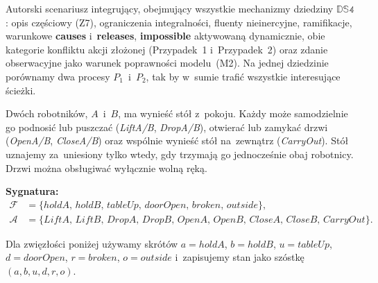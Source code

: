 \documentclass[11pt,a4paper]{article}
\newcommand{\causes}{\textbf{causes}}
\newcommand{\impossible}{\textbf{impossible}}
\newcommand{\releases}{\textbf{releases}}
\theoremstyle{definition}
\begin{document}
\noindent Autorski scenariusz integrujący, obejmujący wszystkie mechanizmy
dziedziny $\mathbb{DS4}$: opis częściowy (Z7), ograniczenia integralności,
fluenty nieinercyjne, ramifikacje, warunkowe \causes{} i~\releases{},
\impossible{} aktywowaną dynamicznie, obie kategorie konfliktu akcji
złożonej (Przypadek~1 i~Przypadek~2) oraz zdanie obserwacyjne jako
warunek poprawności modelu~(M2). Na jednej dziedzinie porównamy dwa procesy $P_1$~i~$P_2$,
tak by w~sumie trafić wszystkie interesujące ścieżki.

Dwóch robotników, $A$~i~$B$, ma wynieść stół z~pokoju. Każdy może
samodzielnie go podnosić lub puszczać (\textit{LiftA/B}, \textit{DropA/B}),
otwierać lub zamykać drzwi (\textit{OpenA/B}, \textit{CloseA/B}) oraz
wspólnie wynieść stół na~zewnątrz (\textit{CarryOut}). Stół uznajemy
za~uniesiony tylko wtedy, gdy trzymają go jednocześnie obaj robotnicy.
Drzwi można obsługiwać wyłącznie wolną ręką.

\medskip
\noindent\textbf{Sygnatura:}
\begin{align*}
  \mathcal{F} &= \{\mathit{holdA},\, \mathit{holdB},\, \mathit{tableUp},\,
                   \mathit{doorOpen},\, \mathit{broken},\, \mathit{outside}\}, \\
  \mathcal{A} &= \{\mathit{LiftA},\, \mathit{LiftB},\, \mathit{DropA},\, \mathit{DropB},\,
                   \mathit{OpenA},\, \mathit{OpenB},\, \mathit{CloseA},\, \mathit{CloseB},\,
                   \mathit{CarryOut}\}.
\end{align*}

\smallskip\noindent
Dla zwięzłości poniżej używamy skrótów
$a = \mathit{holdA}$, $b = \mathit{holdB}$, $u = \mathit{tableUp}$,
$d = \mathit{doorOpen}$, $r = \mathit{broken}$, $o = \mathit{outside}$
i~zapisujemy stan jako szóstkę $(a,b,u,d,r,o)$.
\end{document}
